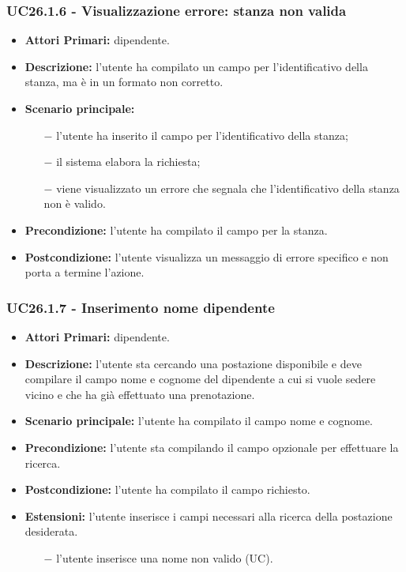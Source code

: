 \subsubsection{ UC26.1.6 - Visualizzazione errore: stanza non valida }
\begin{itemize}
	\item\textbf{Attori Primari:} dipendente.
	\item\textbf{Descrizione:} l’utente ha compilato un campo per l'identificativo della stanza, ma è in un formato non corretto.
	\item\textbf{Scenario principale:} 
	\begin{itemize}
		\item[$-$] l’utente ha inserito il campo per l'identificativo della stanza;
		\item[$-$] il sistema elabora la richiesta;
		\item[$-$] viene visualizzato un errore che segnala che l'identificativo della stanza non è valido.
	\end{itemize}
	\item\textbf{Precondizione:} l’utente ha compilato il campo per la stanza.
	\item\textbf{Postcondizione:} l’utente visualizza un messaggio di errore specifico e non porta a termine l’azione.
\end{itemize}

\subsubsection{ UC26.1.7 - Inserimento nome dipendente }
\begin{itemize}
	\item\textbf{Attori Primari:} dipendente.
	\item\textbf{Descrizione:} l’utente sta cercando una postazione disponibile e deve compilare il campo nome e cognome del dipendente a cui si vuole sedere vicino e che ha già effettuato una prenotazione.
	\item\textbf{Scenario principale:} l’utente ha compilato il campo nome e cognome.
	\item\textbf{Precondizione:} l’utente sta compilando il campo opzionale per effettuare la ricerca.
	\item\textbf{Postcondizione:} l’utente ha compilato il campo richiesto.
	\item\textbf{Estensioni:} l’utente inserisce i campi necessari alla ricerca della postazione desiderata.
	\begin{itemize}
		\item[$-$] l’utente inserisce una nome non valido (UC).
	\end{itemize}
\end{itemize}
